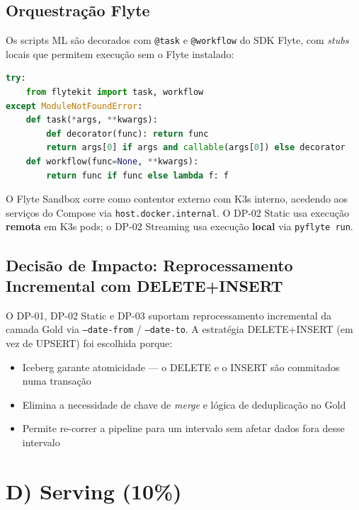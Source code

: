 \documentclass[11pt,a4paper]{article}
\begin{document}
\subsection{Orquestração Flyte}

Os scripts ML são decorados com \texttt{@task} e \texttt{@workflow} do SDK Flyte, com \textit{stubs} locais que permitem execução sem o Flyte instalado:

\begin{lstlisting}[language=Python]
try:
    from flytekit import task, workflow
except ModuleNotFoundError:
    def task(*args, **kwargs):
        def decorator(func): return func
        return args[0] if args and callable(args[0]) else decorator
    def workflow(func=None, **kwargs):
        return func if func else lambda f: f
\end{lstlisting}

O Flyte Sandbox corre como contentor externo com K3s interno, acedendo aos serviços do Compose via \texttt{host.docker.internal}. O DP-02 Static usa execução \textbf{remota} em K3s pods; o DP-02 Streaming usa execução \textbf{local} via \texttt{pyflyte run}.

\subsection{Decisão de Impacto: Reprocessamento Incremental com DELETE+INSERT}

O DP-01, DP-02 Static e DP-03 suportam reprocessamento incremental da camada Gold via \texttt{--date-from} / \texttt{--date-to}. A estratégia DELETE+INSERT (em vez de UPSERT) foi escolhida porque:
\begin{itemize}[leftmargin=*,noitemsep]
  \item Iceberg garante atomicidade --- o DELETE e o INSERT são commitados numa transação
  \item Elimina a necessidade de chave de \textit{merge} e lógica de deduplicação no Gold
  \item Permite re-correr a pipeline para um intervalo sem afetar dados fora desse intervalo
\end{itemize}

\section{D) Serving (10\%)}
\end{document}
